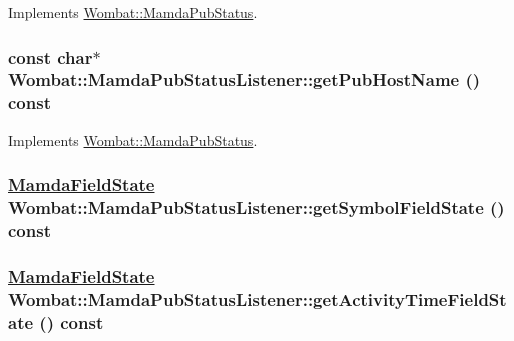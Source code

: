Implements \hyperlink{classWombat_1_1MamdaPubStatus_ebb16e566721f6f423bf09124245c50e}{Wombat::Mamda\-Pub\-Status}.\hypertarget{classWombat_1_1MamdaPubStatusListener_0623f4d8813595a3306cb929b518664e}{
\subsubsection[getPubHostName]{\setlength{\rightskip}{0pt plus 5cm}const char$\ast$ Wombat::Mamda\-Pub\-Status\-Listener::get\-Pub\-Host\-Name () const}}
\label{classWombat_1_1MamdaPubStatusListener_0623f4d8813595a3306cb929b518664e}




Implements \hyperlink{classWombat_1_1MamdaPubStatus_3d9fde3f554888ebb5f104c134decf60}{Wombat::Mamda\-Pub\-Status}.\hypertarget{classWombat_1_1MamdaPubStatusListener_5072c477fd34a25138e39f6fb732956b}{
\subsubsection[getSymbolFieldState]{\setlength{\rightskip}{0pt plus 5cm}\hyperlink{namespaceWombat_93aac974f2ab713554fd12a1fa3b7d2a}{Mamda\-Field\-State} Wombat::Mamda\-Pub\-Status\-Listener::get\-Symbol\-Field\-State () const}}
\label{classWombat_1_1MamdaPubStatusListener_5072c477fd34a25138e39f6fb732956b}


\hypertarget{classWombat_1_1MamdaPubStatusListener_4a6dd432e42df809ec71070125d617e5}{
\subsubsection[getActivityTimeFieldState]{\setlength{\rightskip}{0pt plus 5cm}\hyperlink{namespaceWombat_93aac974f2ab713554fd12a1fa3b7d2a}{Mamda\-Field\-State} Wombat::Mamda\-Pub\-Status\-Listener::get\-Activity\-Time\-Field\-State () const}}
\label{classWombat_1_1MamdaPubStatusListener_4a6dd432e42df809ec71070125d617e5}


